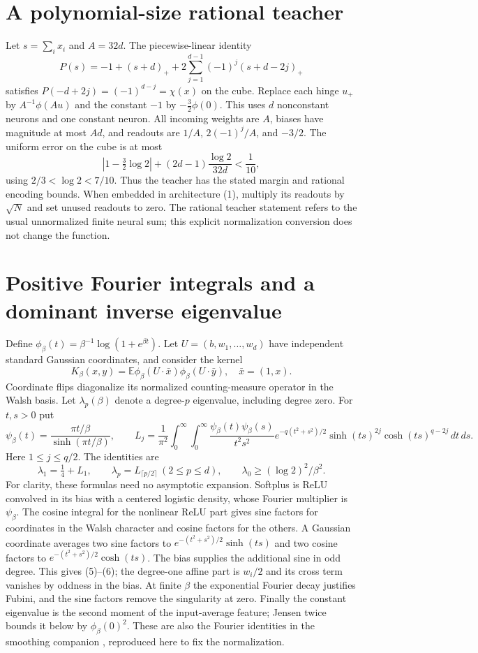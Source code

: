 \documentclass[11pt]{article}
\newcommand{\E}{\mathbb E}\newcommand{\Pp}{\mathbb P}
\begin{document}
\section{A polynomial-size rational teacher}
Let $s=\sum_i x_i$ and $A=32d$. The piecewise-linear identity
\[
 P(s)=-1+(s+d)_+
            +2\sum_{j=1}^{d-1}(-1)^j(s+d-2j)_+
\]
satisfies $P(-d+2j)=(-1)^{d-j}=\chi(x)$ on the cube.
Replace each hinge $u_+$ by $A^{-1}\phi(Au)$ and the constant $-1$
by $-\tfrac32\phi(0)$. This uses $d$ nonconstant neurons and one
constant neuron. All incoming weights are $A$, biases have magnitude
at most $Ad$, and readouts are $1/A$, $2(-1)^j/A$, and $-3/2$.
The uniform error on the cube is at most
\[
 |1-\tfrac32\log2|+(2d-1)\frac{\log2}{32d}<\frac1{10},
\]
using $2/3<\log2<7/10$. Thus the teacher has the stated margin and
rational encoding bounds. When embedded in architecture (1), multiply
its readouts by $\sqrt N$ and set unused readouts to zero. The rational
teacher statement refers to the usual unnormalized finite neural sum;
this explicit normalization conversion does not change the function.

\section{Positive Fourier integrals and a dominant inverse eigenvalue}
Define $\phi_\beta(t)=\beta^{-1}\log(1+e^{\beta t})$. Let
$U=(b,w_1,\ldots,w_d)$ have independent standard Gaussian coordinates,
and consider the kernel
\[
             K_\beta(x,y)=\E\phi_\beta(U\cdot\bar x)
                                    \phi_\beta(U\cdot\bar y),
                         \quad \bar x=(1,x).
\]
Coordinate flips diagonalize its normalized counting-measure operator
in the Walsh basis. Let $\lambda_p(\beta)$ denote a degree-$p$
eigenvalue, including degree zero. For $t,s>0$ put
\[
 \psi_\beta(t)=\frac{\pi t/\beta}{\sinh(\pi t/\beta)},\qquad
 L_j=\frac1{\pi^2}\int_0^\infty\!\int_0^\infty
 \frac{\psi_\beta(t)\psi_\beta(s)}{t^2s^2}
 e^{-q(t^2+s^2)/2}\sinh(ts)^{2j}\cosh(ts)^{q-2j}\,dt\,ds.
                                                               \tag{5}
\]
Here $1\le j\le q/2$. The identities are
\[
 \lambda_1=\tfrac14+L_1,\qquad
 \lambda_p=L_{\lceil p/2\rceil}\ (2\le p\le d),\qquad
 \lambda_0\ge(\log2)^2/\beta^2.                         \tag{6}
\]
For clarity, these formulas need no asymptotic expansion. Softplus is
ReLU convolved in its bias with a centered logistic density, whose
Fourier multiplier is $\psi_\beta$. The cosine integral for the
nonlinear ReLU part gives sine factors for coordinates in the Walsh
character and cosine factors for the others. A Gaussian coordinate
averages two sine factors to $e^{-(t^2+s^2)/2}\sinh(ts)$ and two cosine
factors to $e^{-(t^2+s^2)/2}\cosh(ts)$. The bias supplies the additional
sine in odd degree. This gives (5)--(6); the degree-one affine part is
$w_i/2$ and its cross term vanishes by oddness in the bias.
At finite $\beta$ the exponential Fourier decay justifies Fubini,
and the sine factors remove the singularity at zero. Finally the
constant eigenvalue is the second moment of the input-average feature;
Jensen twice bounds it below by $\phi_\beta(0)^2$.
These are also the Fourier identities in the smoothing companion
\cite{smoothing}, reproduced here to fix the normalization.
\end{document}
